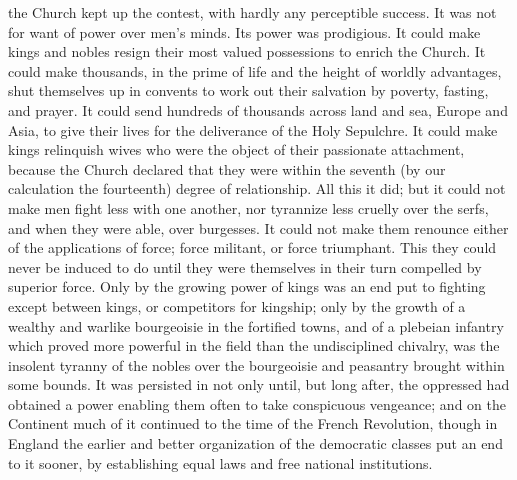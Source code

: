 \documentclass[12pt]{report}
\begin{document}
the Church kept up the contest, with hardly any perceptible success. It was not for want of power over men's minds. Its power was prodigious. It could make kings and nobles resign their most valued possessions to enrich the Church. It could make thousands, in the prime of life and the height of worldly advantages, shut themselves up in convents to work out their salvation by poverty, fasting, and prayer. It could send hundreds of thousands across land and sea, Europe and Asia, to give their lives for the deliverance of the Holy Sepulchre. It could make kings relinquish wives who were the object of their passionate attachment, because the Church declared that they were within the seventh (by our calculation the fourteenth) degree of relationship. All this it did; but it could not make men fight less with one another, nor tyrannize less cruelly over the serfs, and when they were able, over burgesses. It could not make them renounce either of the applications of force; force militant, or force triumphant. This they could never be induced to do until they were themselves in their turn compelled by superior force. Only by the growing power of kings was an end put to fighting except between kings, or competitors for kingship; only by the growth of a wealthy and warlike bourgeoisie in the fortified towns, and of a plebeian infantry which proved more powerful in the field than the undisciplined chivalry, was the insolent tyranny of the nobles over the bourgeoisie and peasantry brought within some bounds. It was persisted in not only until, but long after, the oppressed had obtained a power enabling them often to take conspicuous vengeance; and on the Continent much of it continued to the time of the French Revolution, though in England the earlier and better organization of the democratic classes put an end to it sooner, by establishing equal laws and free national institutions.
\end{document}
